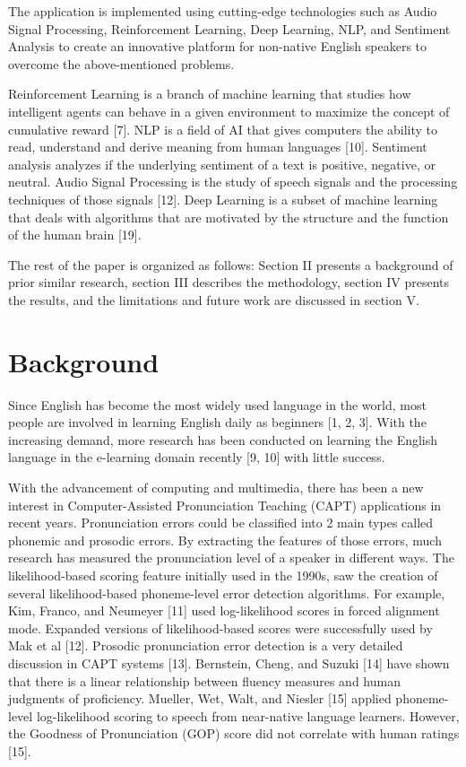 \documentclass[conference]{IEEEtran}
\begin{document}
The application is implemented using cutting-edge technologies such as Audio Signal Processing, Reinforcement Learning, Deep Learning, NLP, and Sentiment Analysis to create an innovative platform for non-native English speakers to overcome the above-mentioned problems.

Reinforcement Learning is a branch of machine learning that studies how intelligent agents can behave in a given environment to maximize the concept of cumulative reward [7]. NLP is a field of AI that gives computers the ability to read, understand and derive meaning from human languages [10]. Sentiment analysis analyzes if the underlying sentiment of a text is positive, negative, or neutral. Audio Signal Processing is the study of speech signals and the processing techniques of those signals [12]. Deep Learning is a subset of machine learning that deals with algorithms that are motivated by the structure and the function of the human brain [19].

The rest of the paper is organized as follows: Section II presents a background of prior similar research, section III describes the methodology, section IV presents the results, and the limitations and future work are discussed in section V.

\section{Background}

Since English has become the most widely used language in the world, most people are involved in learning English daily as beginners [1, 2, 3]. With the increasing demand, more research has been conducted on learning the English language in the e-learning domain recently [9, 10] with little success.

With the advancement of computing and multimedia, there has been a new interest in Computer-Assisted Pronunciation Teaching (CAPT) applications in recent years. Pronunciation errors could be classified into 2 main types called phonemic and prosodic errors. By extracting the features of those errors, much research has measured the pronunciation level of a speaker in different ways. The likelihood-based scoring feature initially used in the 1990s, saw the creation of several likelihood-based phoneme-level error detection algorithms. For example, Kim, Franco, and Neumeyer [11] used log-likelihood scores in forced alignment mode. Expanded versions of likelihood-based scores were successfully used by Mak et al [12]. Prosodic pronunciation error detection is a very detailed discussion in CAPT systems [13]. Bernstein, Cheng, and Suzuki [14] have shown that there is a linear relationship between fluency measures and human judgments of proficiency. Mueller, Wet, Walt, and Niesler [15] applied phoneme-level log-likelihood scoring to speech from near-native language learners. However, the Goodness of Pronunciation (GOP) score did not correlate with human ratings [15].
\end{document}
